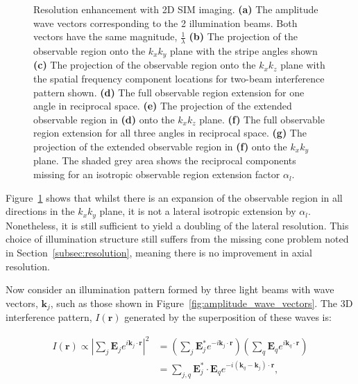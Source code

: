 \begin{figure}
\begin{subfigure}[t]{0.5\textwidth}
		\caption{}
		\label{fig:3D_SIM_OTF_xy_expansion_w_double_rad_filled}
	\end{subfigure}
	\caption[Resolution enhancement with 2D SIM imaging]{Resolution enhancement 
		with 2D SIM imaging. \textbf{(a)} The amplitude wave vectors 
		corresponding to the 2 illumination beams. Both vectors have the 
		same magnitude, $\frac{1}{\lambda}$ \textbf{(b)} The projection of the 
		observable region onto the $k_{x}k_{y}$ plane with the stripe angles 
		shown \textbf{(c)} The projection of the observable region onto the 
		$k_{x}k_{z}$ plane with the spatial frequency component locations for
		two-beam interference pattern shown. \textbf{(d)} The full observable region 
		extension for one angle in reciprocal space. \textbf{(e)} The projection 
		of the extended observable region in \textbf{(d)} onto the $k_{x}k_{z}$ 
		plane. \textbf{(f)} The full observable region extension for all three angles in 
		reciprocal space. \textbf{(g)} The projection of the extended observable 
		region in \textbf{(f)} onto the $k_{x}k_{y}$ plane. The shaded grey area
		shows the reciprocal components missing for an isotropic observable region
		extension factor $\alpha_{l}$.}
	\label{fig:2D_SIM_visualisation}
\end{figure}

Figure~\ref{fig:3D_SIM_OTF_xy_expansion_w_double_rad_filled} shows
that whilst there is an expansion of the observable region in all
directions in the $k_{x}k_{y}$ plane, it is not a lateral isotropic 
extension by $\alpha_{l}$. Nonetheless, it is still sufficient to yield 
a doubling of the lateral resolution\cite{gustafsson2000surpassing}.
This choice of illumination structure still suffers from the missing
cone problem noted in Section~\ref{subsec:resolution}, meaning there
is no improvement in axial resolution.

Now consider an illumination pattern formed by three light beams with
wave vectors, $\textbf{k}_{j}$, such as those shown in 
Figure~\ref{fig:amplitude_wave_vectors}. The 3D interference pattern, 
$I(\textbf{r})$ generated by the superposition of these waves is:

\begin{equation}\label{eq:3_beam_interference}
\begin{split}
I(\textbf{r}) \propto \left|\sum\limits_{j}{\textbf{E}_{j}e^{i\textbf{k}_j\cdot\textbf{r}}}\right|^{2} &= \left(\sum\limits_{j}{\textbf{E}^{*}_{j}e^{-i\textbf{k}_{j}\cdot\textbf{r}}}\right)
\left(\sum\limits_{q}{\textbf{E}_{q}e^{i\textbf{k}_{q}\cdot\textbf{r}}}\right)\\
&= \sum\limits_{j,q}{\textbf{E}^{*}_{j}\cdot\textbf{E}_{q}e^{-i\left(\textbf{k}_{q}-\textbf{k}_{j}\right)\cdot\textbf{r}}},
\end{split}
\end{equation}

